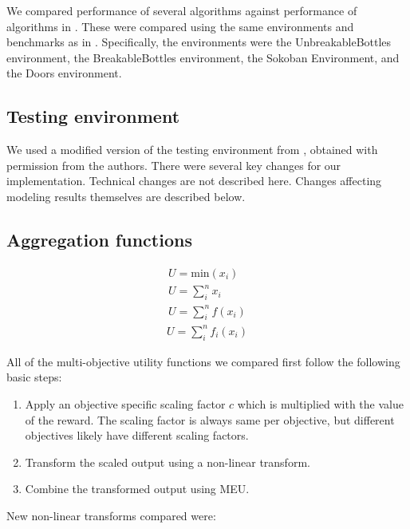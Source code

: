 We compared performance of several algorithms against performance of algorithms in \cite{vamplew_potential-based_2021}. These were compared using the same environments and benchmarks as in \cite{vamplew_potential-based_2021}. Specifically, the environments were the UnbreakableBottles environment, the BreakableBottles environment, the Sokoban Environment, and the Doors environment.
\subsection{Testing environment}

We used a modified version of the testing environment from \cite{vamplew_potential-based_2021}, obtained with permission from the authors. There were several key changes for our implementation. Technical changes are not described here. Changes affecting modeling results themselves are described below.



\subsection{Aggregation functions}

\begin{align}
U=\text{min}({x_i}) \\
U=\sum_{i}^n{x_i} \\
U=\sum_{i}^n{f(x_i)}
\end{align}
\begin{align}
\label{eq:meu}
U=\sum_{i}^n{f_i(x_i)}
\end{align}

All of the multi-objective utility functions we compared first follow the following basic steps:
\begin{enumerate}

    \item Apply an objective specific scaling factor $c$ which is multiplied with the value of the reward. The scaling factor is always same per objective, but different objectives likely have different scaling factors.
    \item Transform the scaled output using a non-linear transform. %
    \item Combine the transformed output using MEU.
\end{enumerate}

 New non-linear transforms compared were:

